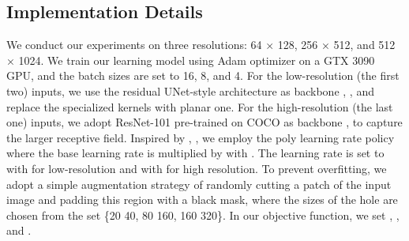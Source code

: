 \documentclass[runningheads]{llncs}
\begin{document}
	
	\subsection{Implementation Details}
	
	
	We conduct our experiments on three resolutions: 64 × 128, 256 × 512, and 512 × 1024.
	We train our learning model using Adam \cite{kingma2014adam} optimizer on a GTX 3090 GPU, and the batch sizes are set to 16, 8, and 4.
	For the low-resolution (the first two) inputs, we use the residual UNet-style architecture as backbone \cite{cohen2019gauge}, \cite{jiang2018spherical}, \cite{zhang2019orientation} and replace the specialized kernels with planar one.
	For the high-resolution (the last one) inputs, we adopt ResNet-101 pre-trained on COCO \cite{lin2014microsoft} as backbone \cite{eder2020tangent}, \cite{sun2021hohonet} to capture the larger receptive field.
	Inspired by \cite{chen2017deeplab}, \cite{huang2019ccnet}, we employ the poly learning rate policy where the base learning rate is multiplied by  with .
	The learning rate is set to  with  for low-resolution and  with  for high resolution.
	To prevent overfitting, we adopt a simple augmentation strategy of randomly cutting a patch of the input image and padding this region with a black mask, where the sizes of the hole are chosen from the set \{20  40, 80  160, 160  320\}. In our objective function, we set , , and .
	
	
	
\end{document}
